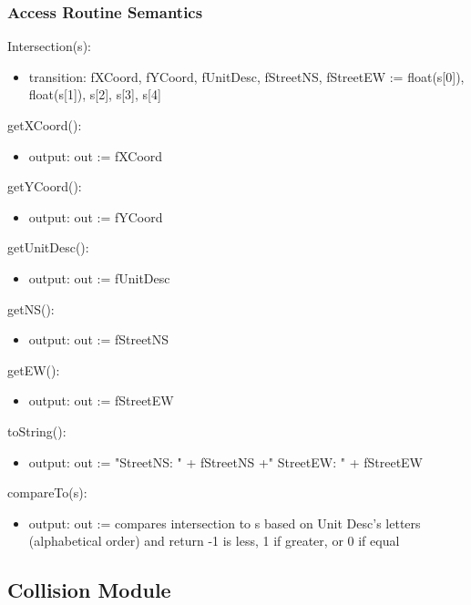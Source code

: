 \documentclass[12pt]{article}
\begin{document}
\subsubsection*{Access Routine Semantics}

\noindent Intersection(s):
\begin{itemize}
    \item transition: fXCoord, fYCoord, fUnitDesc, fStreetNS, fStreetEW := float(s[0]), float(s[1]), s[2], s[3], s[4]
\end{itemize}

\noindent getXCoord():
\begin{itemize}
    \item output: out := fXCoord
\end{itemize}

\noindent getYCoord():
\begin{itemize}
    \item output: out := fYCoord
\end{itemize}

\noindent getUnitDesc():
\begin{itemize}
    \item output: out := fUnitDesc
\end{itemize}

\noindent getNS():
\begin{itemize}
    \item output: out := fStreetNS
\end{itemize}

\noindent getEW():
\begin{itemize}
    \item output: out := fStreetEW
\end{itemize}

\noindent toString():
\begin{itemize}
    \item output: out := "StreetNS: " + fStreetNS +" StreetEW: " + fStreetEW
\end{itemize}

\noindent compareTo(s):
\begin{itemize}
    \item output: out := compares intersection to s based on Unit Desc's letters (alphabetical order) and return -1 is less, 1 if greater, or 0 if equal
\end{itemize}

\newpage
\subsection{Collision Module}
\end{document}
